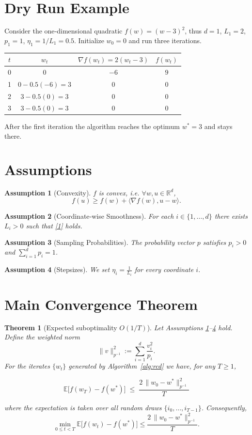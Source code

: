 \documentclass{article}
\newtheorem{theorem}{Theorem}
\newtheorem{assumption}{Assumption}
\newcommand{\E}{\mathbb{E}}
\newcommand{\R}{\mathbb{R}}
\begin{document}
\section*{Dry Run Example}
Consider the one‑dimensional quadratic $f(w)=(w-3)^{2}$, thus $d=1$, $L_1=2$, $p_1=1$, $\eta_1=1/L_1=0.5$.
Initialize $w_0=0$ and run three iterations.

\begin{center}
\begin{tabular}{c|c|c|c}
$t$ & $w_t$ & $\nabla f(w_t)=2(w_t-3)$ & $f(w_t)$\\ \hline
0 & $0$ & $-6$ & $9$\\
1 & $0-0.5(-6)=3$ & $0$ & $0$\\
2 & $3-0.5(0)=3$ & $0$ & $0$\\
3 & $3-0.5(0)=3$ & $0$ & $0$
\end{tabular}
\end{center}
After the first iteration the algorithm reaches the optimum $w^{*}=3$ and stays there.

\newpage
\section*{Assumptions}
\begin{assumption}[Convexity]\label{as:convex}
$f$ is convex, i.e. $\forall w,u\in\R^{d}$,
\[
f(u)\ge f(w)+\langle \nabla f(w),u-w\rangle .
\]
\end{assumption}

\begin{assumption}[Coordinate‑wise Smoothness]\label{as:smooth}
For each $i\in\{1,\dots ,d\}$ there exists $L_i>0$ such that \eqref{1} holds.
\end{assumption}

\begin{assumption}[Sampling Probabilities]\label{as:prob}
The probability vector $p$ satisfies $p_i>0$ and $\sum_{i=1}^{d}p_i=1$.
\end{assumption}

\begin{assumption}[Stepsizes]\label{as:stepsize}
We set $\displaystyle \eta_i=\frac{1}{L_i}$ for every coordinate $i$.
\end{assumption}

\section*{Main Convergence Theorem}
\begin{theorem}[Expected suboptimality $O(1/T)$]\label{thm:main}
Let Assumptions \ref{as:convex}–\ref{as:stepsize} hold.  
Define the weighted norm
\[
\|v\|_{p^{-1}}^{2}:=\sum_{i=1}^{d}\frac{v_i^{2}}{p_i}.
\]
For the iterates $\{w_t\}$ generated by Algorithm~\ref{alg:rcd} we have, for any $T\ge1$,

\[
\boxed{\;
\E\!\bigl[f(w_T)-f(w^{*})\bigr]
\;\le\;
\frac{2\,\|w_0-w^{*}\|_{p^{-1}}^{2}}{T}\;}
\tag{4}
\]

where the expectation is taken over all random draws $\{i_0,\dots ,i_{T-1}\}$.
Consequently,
\[
\min_{0\le t<T}\E\!\bigl[f(w_t)-f(w^{*})\bigr]\le \frac{2\,\|w_0-w^{*}\|_{p^{-1}}^{2}}{T}.
\]
\end{theorem}
\end{document}
